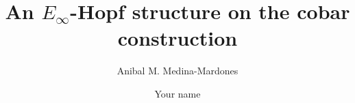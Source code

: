 \documentclass{amsart}
\theoremstyle{definition}
\begin{document}
\title{An $E_\infty$-Hopf structure on the cobar construction}
\author{Anibal M. Medina-Mardones}
\address{Max Plank Institute for Mathematics, Bonn, Germany}
\address{Department of Mathematics, University of Notre Dame, Notre Dame, IN, USA}
\author{Your name}
\address{Your address}


\begin{abstract}
	
\end{abstract} 

\vspace*{-1cm}

\maketitle

\tableofcontents






 


\end{document}
